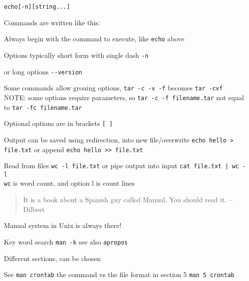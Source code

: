 \documentclass[Screen16to9,17pt]{foils}
\begin{document}

\begin{alltt}
echo [-n] [string ...]
\end{alltt}

\begin{list1}
\item Commands are written like this:
\begin{list2}
\item Always begin with the command to execute, like \verb+echo+ above
\item Options typically short form with single dash \verb+-n+
\item or long options \verb+--version+
\item Some commands allow grouing options, \verb+tar -c -v -f+ becomes \verb+tar -cvf+\\
NOTE: some options require parameters, so \verb+tar -c -f filename.tar+ not equal to \verb+tar -fc filename.tar+
\item Optional options are in brackets \verb+[ ]+
\item Output can be saved using redirection, into new file/overwrite \verb+echo hello > file.txt+ or append \verb+echo hello >> file.txt+
\item Read from files \verb+wc -l file.txt+ or pipe output into input \verb+cat file.txt | wc -l+\\
\verb+wc+ is word count, and option l is count lines
\end{list2}
\end{list1}





\begin{quote}
 It is a book about a Spanish guy called Manual. You should read it.
       -- Dilbert
\end{quote}

\begin{list1}
\item Manual system in Unix is always there!
\item Key word search \verb+man -k+ see also \verb+apropos+
\item Different sections, can be chosen
\end{list1}

See \verb+man crontab+ the command vs the file format in section 5 \verb+man 5 crontab+
\end{document}

